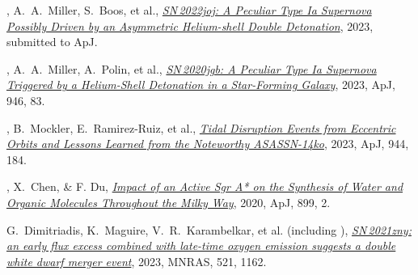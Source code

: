 


\begin{cvpubs}


\cvpub
{ %
\begin{cvitems}
\item {{\bf \color{darktext}{C.~Liu}}, A.~A.~Miller, S.~Boos, et al., \href{https://arxiv.org/abs/2308.06319}{\textit{SN\,2022joj: A Peculiar Type Ia Supernova Possibly Driven by an Asymmetric Helium-shell Double Detonation}}, 2023, submitted to ApJ.}
\item {{\bf \color{darktext}{C.~Liu}}, A.~A.~Miller, A.~Polin, et al., \href{https://iopscience.iop.org/article/10.3847/1538-4357/acbb5e/meta}{\textit{SN\,2020jgb: A Peculiar Type Ia Supernova Triggered by a Helium-Shell Detonation in a Star-Forming Galaxy}}, 2023, ApJ, 946, 83.}
\item {{\bf \color{darktext}{C.~Liu}}, B.~Mockler, E.~Ramirez-Ruiz, et al., \href{https://iopscience.iop.org/article/10.3847/1538-4357/acafe1}{\textit{Tidal Disruption Events from Eccentric Orbits and Lessons Learned from the Noteworthy ASASSN-14ko}}, 2023, ApJ, 944, 184.}
\item {{\bf \color{darktext}{C.~Liu}}, X.~Chen, \& F. Du, \href{https://iopscience.iop.org/article/10.3847/1538-4357/aba758}{\textit{Impact of an Active Sgr A* on the Synthesis of Water and Organic Molecules Throughout the Milky Way}}, 2020, ApJ, 899, 2.}
\item {G.~Dimitriadis, K.~Maguire, V.~R.~Karambelkar, et al. (including {\bf \color{darktext}{C.~Liu}}), \href{https://academic.oup.com/mnras/article-abstract/521/1/1162/7059222?redirectedFrom=fulltext}{\textit{SN\,2021zny: an early flux excess combined with late-time oxygen emission suggests a double white dwarf merger event}}, 2023, MNRAS, 521, 1162.}
\end{cvitems}
}


\end{cvpubs}